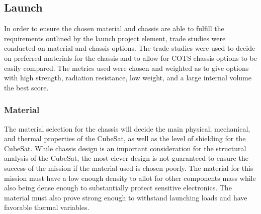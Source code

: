 
\subsection{Launch}
In order to ensure the chosen material and chassis are able to fulfill the requirements outlined by the launch project element, trade studies were conducted on material and chassis options. The trade studies were used to decide on preferred materials for the chassis and to allow for COTS chassis options to be easily compared. The metrics used were chosen and weighted as to give options with high strength, radiation resistance, low weight, and a large internal volume the best score.
\subsubsection{Material}
The material selection for the chassis will decide the main physical, mechanical, and thermal properties of the CubeSat, as well as the level of shielding for the CubeSat. While chassis design is an important consideration for the structural analysis of the CubeSat, the most clever design is not guaranteed to ensure the success of the mission if the material used is chosen poorly. The material for this mission must have a low enough density to allot for other components mass while also being dense enough to substantially protect sensitive electronics. The material must also prove strong enough to withstand launching loads and have favorable thermal variables.

